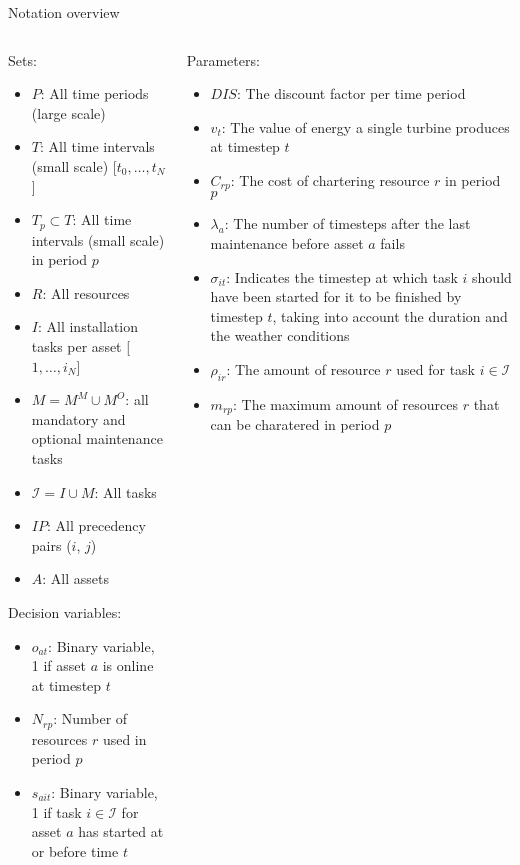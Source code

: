 \documentclass{beamer}
\begin{document}
\begin{frame}{Notation overview}
\tiny

\begin{columns}
\begin{column}{.48\textwidth}
Sets:
\begin{itemize}
\item $P$: All time periods (large scale)
\item $T$: All time intervals (small scale) [$t_0, \dots , t_N$]
\item $T_p \subset T$: All time intervals (small scale) in period $p$
\item $R$: All resources
\item $I$: All installation tasks per asset [$1, \dots , i_N$]
\item $M = M^M \cup M^O$: all mandatory and optional maintenance tasks
\item $\mathcal{I} = I \cup M$: All tasks
\item $IP$: All precedency pairs ($i$, $j$)
\item $A$: All assets
\end{itemize}

Decision variables:
\begin{itemize}
\item $o_{at}$: Binary variable, 1 if asset $a$ is online at timestep $t$
\item $N_{rp}$: Number of resources $r$ used in period $p$
\item $s_{ait}$: Binary variable, 1 if task $i \in \mathcal{I}$ for asset $a$ has started at or before time $t$
\end{itemize}
\end{column}

\hfill

\begin{column}{.48\textwidth}
Parameters:
\begin{itemize}
\item $DIS$: The discount factor per time period
\item $v_t$: The value of energy a single turbine produces at timestep $t$
\item $C_{rp}$: The cost of chartering resource $r$ in period $p$
\item $\lambda_a$: The number of timesteps after the last maintenance before asset $a$ fails
\item $\sigma_{it}$: Indicates the timestep at which task $i$ should have been started for it to be finished by timestep $t$, taking into account the duration and the weather conditions
\item $\rho_{ir}$: The amount of resource $r$ used for task $i \in \mathcal{I}$
\item $m_{rp}$: The maximum amount of resources $r$ that can be charatered in period $p$
\end{itemize}
\end{column}
\end{columns}

\end{frame}
\end{document}
